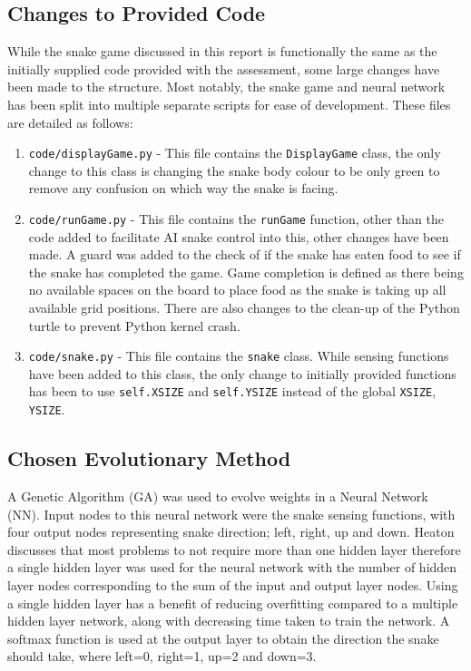 \subsection{Changes to Provided Code}
While the snake game discussed in this report is functionally the same as the initially supplied code provided with the assessment, some large changes have been made to the structure. Most notably, the snake game and neural network has been split into multiple separate scripts for ease of development. These files are detailed as follows:

\begin{enumerate}
  \item \verb|code/displayGame.py| - This file contains the \verb|DisplayGame| class, the only change to this class is changing the snake body colour to be only green to remove any confusion on which way the snake is facing.
  \item \verb|code/runGame.py| - This file contains the \verb|runGame| function, other than the code added to facilitate AI snake control into this, other changes have been made. A guard was added to the check of if the snake has eaten food to see if the snake has completed the game. Game completion is defined as there being no available spaces on the board to place food as the snake is taking up all available grid positions. There are also changes to the clean-up of the Python turtle to prevent Python kernel crash. 
  \item \verb|code/snake.py| - This file contains the \verb|snake| class. While sensing functions have been added to this class, the only change to initially provided functions has been to use \verb|self.XSIZE| and \verb|self.YSIZE| instead of the global \verb|XSIZE|, \verb|YSIZE|.
\end{enumerate}

\subsection{Chosen Evolutionary Method}
A Genetic Algorithm (GA) was used to evolve weights in a Neural Network (NN). Input nodes to this neural network were the snake sensing functions, with four output nodes representing snake direction; left, right, up and down. Heaton \cite{heaton} discusses that most problems to not require more than one hidden layer therefore a single hidden layer was used for the neural network with the number of hidden layer nodes corresponding to the sum of the input and output layer nodes. Using a single hidden layer has a benefit of reducing overfitting compared to a multiple hidden layer network, along with decreasing time taken to train the network. A softmax function is used at the output layer to obtain the direction the snake should take, where left=0, right=1, up=2 and down=3. 


